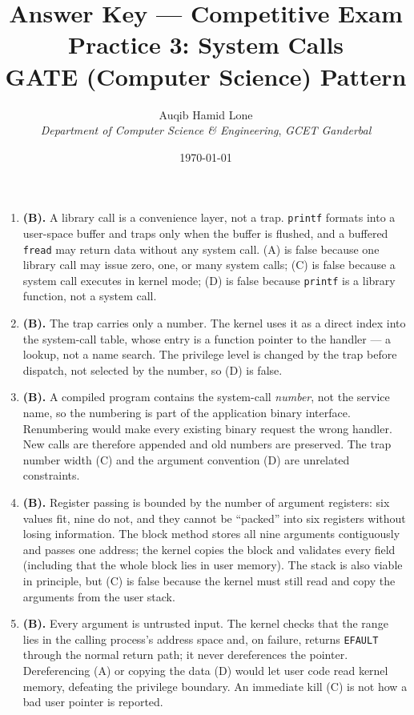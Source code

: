 \documentclass[11pt]{article}
\title{Answer Key --- Competitive Exam Practice 3: System Calls\\\large GATE (Computer Science) Pattern}
\author{Auqib Hamid Lone\\[0.3em]
  \emph{Department of Computer Science \& Engineering}, \emph{GCET Ganderbal}}
\date{\today}
\begin{document}
\maketitle

\begin{enumerate}
\item[\textbf{Q1}] \textbf{(B).} A library call is a convenience layer, not a trap. \texttt{printf} formats into a user-space buffer and traps only when the buffer is flushed, and a buffered \texttt{fread} may return data without any system call. (A) is false because one library call may issue zero, one, or many system calls; (C) is false because a system call executes in kernel mode; (D) is false because \texttt{printf} is a library function, not a system call.

\item[\textbf{Q2}] \textbf{(B).} The trap carries only a number. The kernel uses it as a direct index into the system-call table, whose entry is a function pointer to the handler --- a lookup, not a name search. The privilege level is changed by the trap before dispatch, not selected by the number, so (D) is false.

\item[\textbf{Q3}] \textbf{(B).} A compiled program contains the system-call \emph{number}, not the service name, so the numbering is part of the application binary interface. Renumbering would make every existing binary request the wrong handler. New calls are therefore appended and old numbers are preserved. The trap number width (C) and the argument convention (D) are unrelated constraints.

\item[\textbf{Q4}] \textbf{(B).} Register passing is bounded by the number of argument registers: six values fit, nine do not, and they cannot be ``packed'' into six registers without losing information. The block method stores all nine arguments contiguously and passes one address; the kernel copies the block and validates every field (including that the whole block lies in user memory). The stack is also viable in principle, but (C) is false because the kernel must still read and copy the arguments from the user stack.

\item[\textbf{Q5}] \textbf{(B).} Every argument is untrusted input. The kernel checks that the range lies in the calling process's address space and, on failure, returns \texttt{EFAULT} through the normal return path; it never dereferences the pointer. Dereferencing (A) or copying the data (D) would let user code read kernel memory, defeating the privilege boundary. An immediate kill (C) is not how a bad user pointer is reported.


\end{enumerate}
\end{document}
